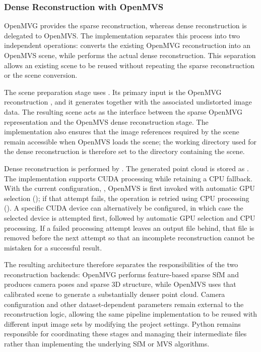 \subsubsection{Dense Reconstruction with OpenMVS}

OpenMVG provides the sparse reconstruction, whereas dense reconstruction is
delegated to OpenMVS. The implementation separates this process into two
independent operations:  converts the existing OpenMVG
reconstruction into an OpenMVS scene, while  performs the
actual dense reconstruction. This separation allows an existing scene to be
reused without repeating the sparse reconstruction or the scene conversion.

The scene preparation stage uses
. Its primary input is the OpenMVG
reconstruction , and it generates
 together with the associated undistorted image
data. The resulting scene acts as the interface between the sparse OpenMVG
representation and the OpenMVS dense reconstruction stage. The implementation
also ensures that the image references required by the scene remain
accessible when OpenMVS loads the scene; the working directory used for the
dense reconstruction is therefore set to the directory containing the scene.

Dense reconstruction is performed by . The
generated point cloud is stored as
. The implementation supports CUDA
processing while retaining a CPU fallback. With the current configuration,
, OpenMVS is first invoked with automatic GPU
selection (); if that attempt fails, the operation is retried using
CPU processing (). A specific CUDA device can alternatively be
configured, in which case the selected device is attempted first, followed by
automatic GPU selection and CPU processing. If a failed processing attempt
leaves an output file behind, that file is removed before the next attempt so
that an incomplete reconstruction cannot be mistaken for a successful
result.

The resulting architecture therefore separates the responsibilities of the
two reconstruction backends: OpenMVG performs feature-based sparse SfM and
produces camera poses and sparse 3D structure, while OpenMVS uses that
calibrated scene to generate a substantially denser point cloud. Camera
configuration and other dataset-dependent parameters remain external to the
reconstruction logic, allowing the same pipeline implementation to be reused
with different input image sets by modifying the project settings. Python
remains responsible for coordinating these stages and managing their
intermediate files rather than implementing the underlying SfM or MVS
algorithms.

